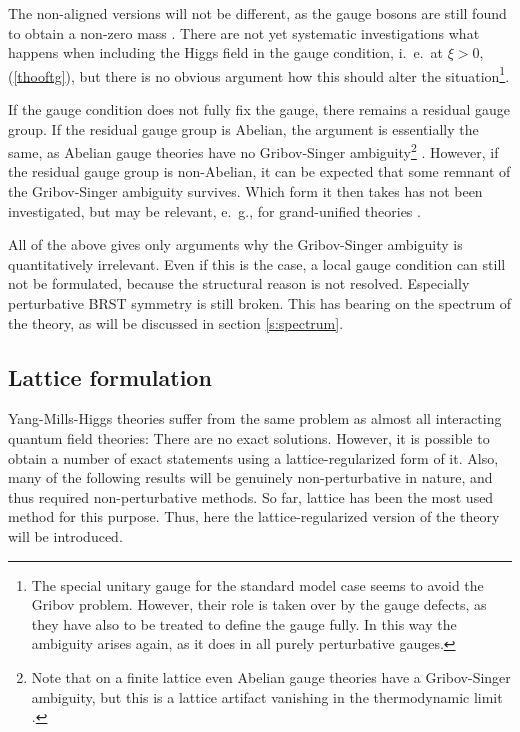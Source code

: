 \documentclass[final,12pt]{article}
\newcommand*{\pref}[1]{(\ref{#1})}
\newcommand*{\1}{1\!\!\!\bot}
\begin{document}
The non-aligned versions will not be different, as the gauge bosons are still found to obtain a non-zero mass \cite{Maas:2010nc}. There are not yet systematic investigations what happens when including the Higgs field in the gauge condition, i.\ e.\ at $\xi>0$, \pref{thooftg}, but there is no obvious argument how this should alter the situation\footnote{The special unitary gauge for the standard model case \cite{Bohm:2001yx} seems to avoid the Gribov problem. However, their role is taken over by the gauge defects, as they have also to be treated to define the gauge fully. In this way the ambiguity arises again, as it does in all purely perturbative gauges.}.

If the gauge condition does not fully fix the gauge, there remains a residual gauge group. If the residual gauge group is Abelian, the argument is essentially the same, as Abelian gauge theories have no Gribov-Singer ambiguity\footnote{Note that on a finite lattice even Abelian gauge theories have a Gribov-Singer ambiguity, but this is a lattice artifact vanishing in the thermodynamic limit \cite{deForcrand:1994mz,Giusti:2001xf}.} \cite{Lenz:1994tb,Lenz:2000zt}. However, if the residual gauge group is non-Abelian, it can be expected that some remnant of the Gribov-Singer ambiguity survives. Which form it then takes has not been investigated, but may be relevant, e.\ g., for grand-unified theories \cite{Georgi:1974sy,Georgi:1974yf,Langacker:1980js}.

All of the above gives only arguments why the Gribov-Singer ambiguity is quantitatively irrelevant. Even if this is the case, a local gauge condition can still not be formulated, because the structural reason is not resolved. Especially perturbative BRST symmetry is still broken. This has bearing on the spectrum of the theory, as will be discussed in section \ref{s:spectrum}.

\subsection{Lattice formulation}\label{ss:lattice}

Yang-Mills-Higgs theories suffer from the same problem as almost all interacting quantum field theories: There are no exact solutions. However, it is possible to obtain a number of exact statements using a lattice-regularized form of it. Also, many of the following results will be genuinely non-perturbative in nature, and thus required non-perturbative methods. So far, lattice has been the most used method for this purpose. Thus, here the lattice-regularized version of the theory will be introduced.
\end{document}
